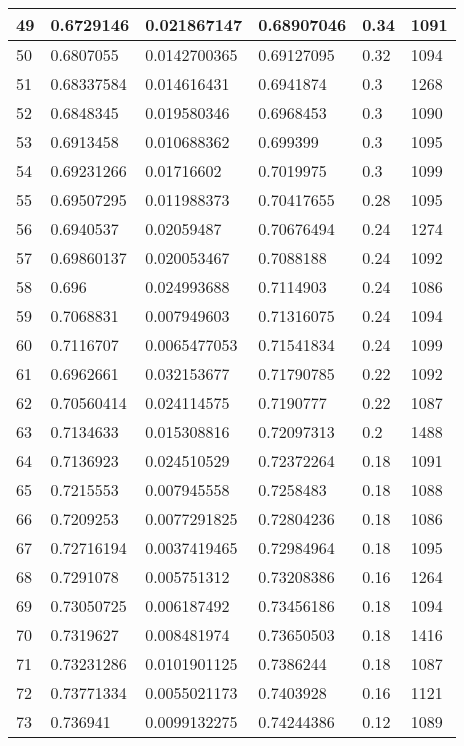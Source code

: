 \begin{longtable}{|l|l|l|l|l|l|}
49 & 0.6729146 & 0.021867147 & 0.68907046 & 0.34 & 1091 \\ \hline 
50 & 0.6807055 & 0.0142700365 & 0.69127095 & 0.32 & 1094 \\ \hline 
51 & 0.68337584 & 0.014616431 & 0.6941874 & 0.3 & 1268 \\ \hline 
52 & 0.6848345 & 0.019580346 & 0.6968453 & 0.3 & 1090 \\ \hline 
53 & 0.6913458 & 0.010688362 & 0.699399 & 0.3 & 1095 \\ \hline 
54 & 0.69231266 & 0.01716602 & 0.7019975 & 0.3 & 1099 \\ \hline 
55 & 0.69507295 & 0.011988373 & 0.70417655 & 0.28 & 1095 \\ \hline 
56 & 0.6940537 & 0.02059487 & 0.70676494 & 0.24 & 1274 \\ \hline 
57 & 0.69860137 & 0.020053467 & 0.7088188 & 0.24 & 1092 \\ \hline 
58 & 0.696 & 0.024993688 & 0.7114903 & 0.24 & 1086 \\ \hline 
59 & 0.7068831 & 0.007949603 & 0.71316075 & 0.24 & 1094 \\ \hline 
60 & 0.7116707 & 0.0065477053 & 0.71541834 & 0.24 & 1099 \\ \hline 
61 & 0.6962661 & 0.032153677 & 0.71790785 & 0.22 & 1092 \\ \hline 
62 & 0.70560414 & 0.024114575 & 0.7190777 & 0.22 & 1087 \\ \hline 
63 & 0.7134633 & 0.015308816 & 0.72097313 & 0.2 & 1488 \\ \hline 
64 & 0.7136923 & 0.024510529 & 0.72372264 & 0.18 & 1091 \\ \hline 
65 & 0.7215553 & 0.007945558 & 0.7258483 & 0.18 & 1088 \\ \hline 
66 & 0.7209253 & 0.0077291825 & 0.72804236 & 0.18 & 1086 \\ \hline 
67 & 0.72716194 & 0.0037419465 & 0.72984964 & 0.18 & 1095 \\ \hline 
68 & 0.7291078 & 0.005751312 & 0.73208386 & 0.16 & 1264 \\ \hline 
69 & 0.73050725 & 0.006187492 & 0.73456186 & 0.18 & 1094 \\ \hline 
70 & 0.7319627 & 0.008481974 & 0.73650503 & 0.18 & 1416 \\ \hline 
71 & 0.73231286 & 0.0101901125 & 0.7386244 & 0.18 & 1087 \\ \hline 
72 & 0.73771334 & 0.0055021173 & 0.7403928 & 0.16 & 1121 \\ \hline 
73 & 0.736941 & 0.0099132275 & 0.74244386 & 0.12 & 1089 \\ \hline 

\end{longtable}
